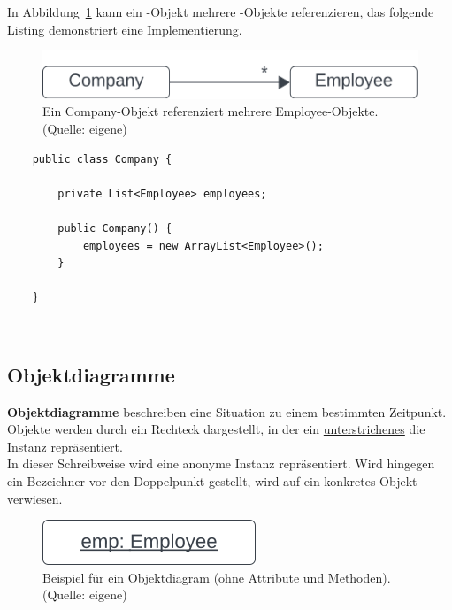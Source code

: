 \noindent
In Abbildung~\ref{fig:multipleemployees} kann ein -Objekt mehrere -Objekte referenzieren, das folgende Listing demonstriert eine Implementierung.\\

\begin{figure}
    \centering
    \includegraphics[scale=0.5]{chapters/fopt3/img/multipleemployees}
    \caption{Ein Company-Objekt referenziert mehrere Employee-Objekte. (Quelle: eigene)}
    \label{fig:multipleemployees}
\end{figure}


\begin{verbatim}
    public class Company {

        private List<Employee> employees;

        public Company() {
            employees = new ArrayList<Employee>();
        }

    }
\end{verbatim}\\

\subsection{Objektdiagramme}

\textbf{Objektdiagramme} beschreiben eine Situation zu einem bestimmten Zeitpunkt.\\

\noindent
Objekte werden durch ein Rechteck dargestellt, in der ein \ul{unterstrichenes} \code{:[Klassenname]} die Instanz repräsentiert. \\
In dieser Schreibweise wird eine anonyme Instanz repräsentiert.
Wird hingegen ein Bezeichner vor den Doppelpunkt gestellt, wird auf ein konkretes Objekt verwiesen.\\

\begin{figure}
    \centering
    \includegraphics[scale=0.5]{chapters/fopt3/img/objectdiagram}
    \caption{Beispiel für ein Objektdiagram (ohne Attribute und Methoden). (Quelle: eigene)}
    \label{fig:objectdiagram}
\end{figure}

